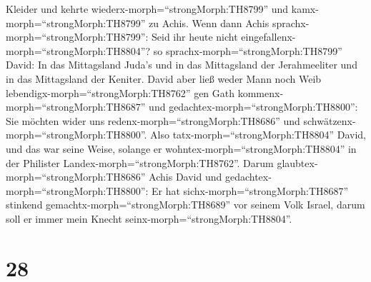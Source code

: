 Kleider und kehrte wiederx-morph=``strongMorph:TH8799'' und
kamx-morph=``strongMorph:TH8799'' zu Achis.  Wenn dann
Achis sprachx-morph=``strongMorph:TH8799'': Seid ihr heute nicht
eingefallenx-morph=``strongMorph:TH8804''? so
sprachx-morph=``strongMorph:TH8799'' David: In das Mittagsland Juda's
und in das Mittagsland der Jerahmeeliter und in das Mittagsland der
Keniter.  David aber ließ weder Mann noch Weib
lebendigx-morph=``strongMorph:TH8762'' gen Gath
kommenx-morph=``strongMorph:TH8687'' und
gedachtex-morph=``strongMorph:TH8800'': Sie möchten wider uns
redenx-morph=``strongMorph:TH8686'' und
schwätzenx-morph=``strongMorph:TH8800''. Also
tatx-morph=``strongMorph:TH8804'' David, und das war seine Weise,
solange er wohntex-morph=``strongMorph:TH8804'' in der Philister
Landex-morph=``strongMorph:TH8762''.  Darum
glaubtex-morph=``strongMorph:TH8686'' Achis David und
gedachtex-morph=``strongMorph:TH8800'': Er hat
sichx-morph=``strongMorph:TH8687'' stinkend
gemachtx-morph=``strongMorph:TH8689'' vor seinem Volk Israel, darum soll
er immer mein Knecht seinx-morph=``strongMorph:TH8804''.

\hypertarget{section-27}{%
\section{28}\label{section-27}}

